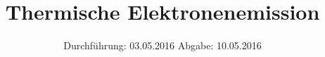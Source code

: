 

\subject{504}
\title{Thermische Elektronenemission}
\date{
  Durchführung: 03.05.2016
  \hspace{3em}
  Abgabe: 10.05.2016
}



\maketitle
\thispagestyle{empty}
\tableofcontents
\newpage






\printbibliography


